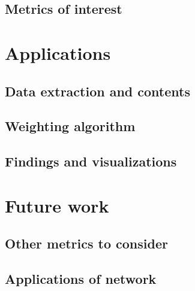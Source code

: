 \documentclass[]{book}
\begin{document}
\section*{Metrics of interest}\label{metrics-of-interest}

\chapter*{Applications}\label{applications}

\section*{Data extraction and
contents}\label{data-extraction-and-contents}

\section*{Weighting algorithm}\label{weighting-algorithm}

\section*{Findings and
visualizations}\label{findings-and-visualizations}

\chapter*{Future work}\label{future-work}

\section*{Other metrics to consider}\label{other-metrics-to-consider}

\section*{Applications of network}\label{applications-of-network}


\end{document}
